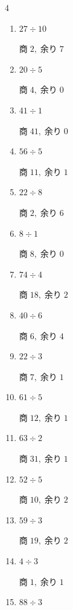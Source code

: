 \begin{multicols}{4}
\begin{enumerate}
        $商\; 4,\; 余り\; 3$

  \item $27 \div 10$

        $商\; 2,\; 余り\; 7$

  \item $20 \div 5$

        $商\; 4,\; 余り\; 0$

  \item $41 \div 1$

        $商\; 41,\; 余り\; 0$

\columnbreak %

  \item $56 \div 5$

        $商\; 11,\; 余り\; 1$

  \item $22 \div 8$

        $商\; 2,\; 余り\; 6$

  \item $8 \div 1$

        $商\; 8,\; 余り\; 0$

  \item $74 \div 4$

        $商\; 18,\; 余り\; 2$

  \item $40 \div 6$

        $商\; 6,\; 余り\; 4$

  \item $22 \div 3$

        $商\; 7,\; 余り\; 1$

  \item $61 \div 5$

        $商\; 12,\; 余り\; 1$

  \item $63 \div 2$

        $商\; 31,\; 余り\; 1$

  \item $52 \div 5$

        $商\; 10,\; 余り\; 2$

  \item $59 \div 3$

        $商\; 19,\; 余り\; 2$

  \item $4 \div 3$

        $商\; 1,\; 余り\; 1$

  \item $88 \div 3$


\end{enumerate}
\end{multicols}

